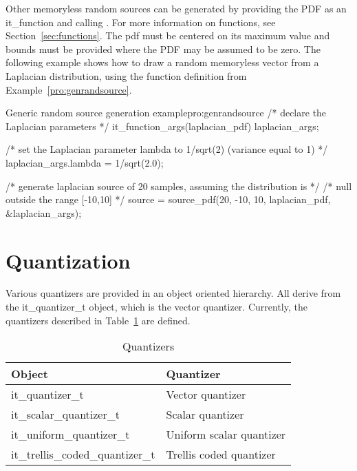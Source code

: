     Other memoryless random sources can be generated by providing the
    PDF as an it\_function and calling 
    . For more information
    on functions, see Section~\ref{sec:functions}. The pdf must be
    centered on its maximum value and bounds must be provided where
    the PDF may be assumed to be zero. The following example shows how
    to draw a random memoryless vector from a Laplacian distribution,
    using the function definition from Example~\ref{pro:genrandsource}.

\begin{program}{Generic random source generation example}{pro:genrandsource}
/* declare the Laplacian parameters */
it_function_args(laplacian_pdf) laplacian_args;

/* set the Laplacian parameter lambda to 1/sqrt(2) (variance equal to 1) */
laplacian_args.lambda = 1/sqrt(2.0);

/* generate laplacian source of 20 samples, assuming the distribution is */
/* null outside the range [-10,10]                                       */
source = source_pdf(20, -10, 10, laplacian_pdf, &laplacian_args);
\end{program}


\section{Quantization}

      Various quantizers are provided in an object oriented
      hierarchy. All derive from the it\_quantizer\_t object, which is
      the vector quantizer. Currently, the quantizers described in 
Table~\ref{tab:quantizertypes} are defined. 

\begin{table}
\begin{center}
\begin{tabular}{|p{5cm}p{5cm}|}
\hline
       Object & Quantizer \\
\hline
          it\_quantizer\_t & 
          Vector quantizer \\
          it\_scalar\_quantizer\_t & 
          Scalar quantizer \\
          it\_uniform\_quantizer\_t & 
          Uniform scalar quantizer \\
          it\_trellis\_coded\_quantizer\_t & 
          Trellis coded quantizer \\
\hline
\end{tabular}
\label{tab:quantizertypes}
\caption{Quantizers}
\end{center}
\end{table}


